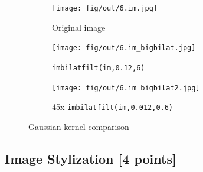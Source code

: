 \documentclass[tikz,14pt,fleqn]{article}
\begin{document}
\begin{figure}[h!]
    \centering
    \begin{subfigure}[b]{0.325\linewidth}
        \centering
        \texttt{[image: fig/out/6.im.jpg]}
        \caption{Original image}
    \end{subfigure}
    \begin{subfigure}[b]{0.325\linewidth}
        \centering
        \texttt{[image: fig/out/6.im\_bigbilat.jpg]}
        \caption{\texttt{imbilatfilt(im,0.12,6)}}
    \end{subfigure}
    \begin{subfigure}[b]{0.325\linewidth}
        \centering
        \texttt{[image: fig/out/6.im\_bigbilat2.jpg]}
        \caption{45x \texttt{imbilatfilt(im,0.012,0.6)}}
        \label{fig:6.3}
    \end{subfigure}
    \caption{Gaussian kernel comparison}
    \label{fig:6}
\end{figure}


\subsection{Image Stylization [4 points]}
\end{document}
